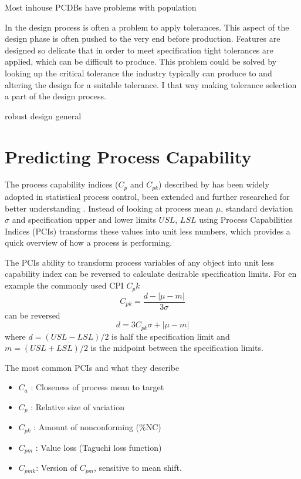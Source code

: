 \documentclass[aip,amsmath, reprint, author-year]{revtex4-1}
\begin{document}
 Most inhouse PCDBs have problems with population


In the design process is often a problem to apply tolerances. This aspect of the design phase is often pushed to the very end before production. Features are designed so delicate that in order to meet specification tight tolerances are applied, which can be difficult to produce.
This problem could be solved by looking up the critical tolerance the industry typically can produce to and altering the design for a suitable tolerance.  I that way making tolerance selection a part of the design process.

robust design general

\section{Predicting Process Capability}
The process capability indices ($C_p$ and $C_{pk}$) described by \cite{kane1986process} has been widely adopted in statistical process control, been extended and further researched for better understanding \citep{wu2009overview}. 
Instead of looking at process mean $\mu$, standard deviation $\sigma$ and specification upper and lower limits $USL$, $LSL$ using Process Capabilities Indices (PCIs) transforms these values into unit less numbers, which provides a quick overview of how a process is performing.

The PCIs ability to transform process variables of any object into unit less capability index can be reversed to calculate desirable specification limits. For en example the commonly used CPI $C_pk$ 
\begin{equation}
	C_{pk} = \frac{d - | \mu - m|}{3 \sigma}
\end{equation}
can be reversed
\begin{equation}
	d = 3 C_{pk} \sigma + | \mu - m|
\end{equation}
where $d = (USL - LSL) / 2$ is half the specification limit and $m = (USL + LSL) / 2$ is the midpoint between the specification limits. 

The most common PCIs and what they describe \citep{wu2009overview, taguchi1986introduction}
\begin{itemize}
	\item $C_a$ : Closeness of process mean to target 
	\item $C_p$ : Relative size of variation
	\item $C_{pk}$ : Amount of nonconforming (\%NC)
	\item $C_{pm}$ : Value loss (Taguchi loss function)
	\item $C_{pmk}$: Version of $C_{pm}$,  sensitive to mean shift. 
\end{itemize}
\end{document}
